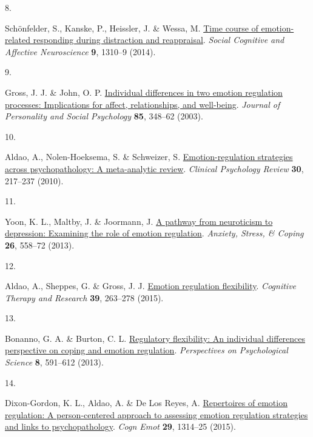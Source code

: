 \documentclass[
  man,floatsintext]{apa6}
\newlength{\cslhangindent}
\newlength{\csllabelwidth}
\newlength{\cslentryspacingunit} %
\newenvironment{CSLReferences}[2] %
 {%
  \setlength{\parindent}{0pt}
  \ifodd #1
  \let\oldpar\par
  \def\par{\hangindent=\cslhangindent\oldpar}
  \fi
  \setlength{\parskip}{#2\cslentryspacingunit}
 }%
 {}
\newcommand{\CSLLeftMargin}[1]{\parbox[t]{\csllabelwidth}{#1}}
\newcommand{\CSLRightInline}[1]{\parbox[t]{\linewidth - \csllabelwidth}{#1}\break}
\begin{document}
\begin{CSLReferences}{0}{0}
\leavevmode{}%
\CSLLeftMargin{8. }%
\CSLRightInline{Schönfelder, S., Kanske, P., Heissler, J. \& Wessa, M. \href{https://doi.org/10.1093/scan/nst116}{Time course of emotion-related responding during distraction and reappraisal}. \emph{Social Cognitive and Affective Neuroscience} \textbf{9}, 1310--9 (2014).}

\leavevmode{}%
\CSLLeftMargin{9. }%
\CSLRightInline{Gross, J. J. \& John, O. P. \href{https://doi.org/10.1037/0022-3514.85.2.348}{Individual differences in two emotion regulation processes: Implications for affect, relationships, and well-being}. \emph{Journal of Personality and Social Psychology} \textbf{85}, 348--62 (2003).}

\leavevmode{}%
\CSLLeftMargin{10. }%
\CSLRightInline{Aldao, A., Nolen-Hoeksema, S. \& Schweizer, S. \href{https://doi.org/10.1016/j.cpr.2009.11.004}{Emotion-regulation strategies across psychopathology: A meta-analytic review}. \emph{Clinical Psychology Review} \textbf{30}, 217--237 (2010).}

\leavevmode{}%
\CSLLeftMargin{11. }%
\CSLRightInline{Yoon, K. L., Maltby, J. \& Joormann, J. \href{https://doi.org/10.1080/10615806.2012.734810}{A pathway from neuroticism to depression: Examining the role of emotion regulation}. \emph{Anxiety, Stress, \& Coping} \textbf{26}, 558--72 (2013).}

\leavevmode{}%
\CSLLeftMargin{12. }%
\CSLRightInline{Aldao, A., Sheppes, G. \& Gross, J. J. \href{https://doi.org/10.1007/s10608-014-9662-4}{Emotion regulation flexibility}. \emph{Cognitive Therapy and Research} \textbf{39}, 263--278 (2015).}

\leavevmode{}%
\CSLLeftMargin{13. }%
\CSLRightInline{Bonanno, G. A. \& Burton, C. L. \href{https://doi.org/10.1177/1745691613504116}{Regulatory flexibility: An individual differences perspective on coping and emotion regulation}. \emph{Perspectives on Psychological Science} \textbf{8}, 591--612 (2013).}

\leavevmode{}%
\CSLLeftMargin{14. }%
\CSLRightInline{Dixon-Gordon, K. L., Aldao, A. \& De Los Reyes, A. \href{https://doi.org/10.1080/02699931.2014.983046}{Repertoires of emotion regulation: A person-centered approach to assessing emotion regulation strategies and links to psychopathology}. \emph{Cogn Emot} \textbf{29}, 1314--25 (2015).}


\end{CSLReferences}
\end{document}
